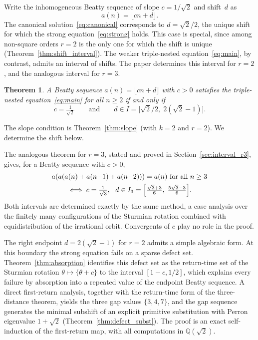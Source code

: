 \documentclass{birkjour}
\newtheorem{theorem}{Theorem}
\theoremstyle{definition}
\theoremstyle{remark}
\newcommand{\fl}[1]{\lfloor #1 \rfloor}
\newcommand{\frc}[1]{\{ #1 \}}
\begin{document}
Write the inhomogeneous Beatty sequence of slope
$c=1/\!\sqrt{2}$ and shift~$d$ as
\[
  a(n)=\fl{cn+d}.
\]
The canonical
solution~\eqref{eq:canonical}
corresponds to $d=\sqrt{2}/2$, the unique shift for which
the strong equation~\eqref{eq:strong} holds. This case is
special, since among non-square orders $r=2$ is the only one
for which the shift is unique
(Theorem~\ref{thm:shift_interval}).
The weaker triple-nested
equation~\eqref{eq:main}, by contrast, admits an interval of
shifts. The paper determines this interval for $r=2$, and the
analogous interval for $r=3$.

\begin{theorem}\label{thm:interval}
A Beatty sequence $a(n)=\fl{cn+d}$ with $c>0$ satisfies
the triple-nested equation~\eqref{eq:main} for all $n\ge 2$
if and only if
\[
  c=\tfrac{1}{\sqrt{2}}\qquad\text{and}\qquad
  d\in I=\bigl[\sqrt{2}/2,\;2(\sqrt{2}-1)\bigr].
\]
\end{theorem}

The slope condition is Theorem~\ref{thm:slope} (with $k=2$ and
$r=2$). We determine the shift below.

The analogous theorem for $r=3$, stated and
proved in Section~\ref{sec:interval_r3}, gives, for a
Beatty sequence with $c>0$,
\[
  \begin{aligned}
    &a(a(a(n)+a(n{-}1)+a(n{-}2)))=a(n)
    \ \text{for all } n\ge 3\\
    &\qquad\iff
    c=\tfrac{1}{\sqrt{3}},\ \
    d\in I_{3}=\Bigl[\tfrac{\sqrt{3}+3}{6},\;
    \tfrac{5\sqrt{3}-3}{6}\Bigr].
  \end{aligned}
\]
Both intervals are determined exactly by the same method, a
case analysis over the finitely many configurations of the
Sturmian rotation combined with equidistribution of the
irrational orbit. Convergents of $c$ play no role in the
proof.

The right endpoint $d=2(\sqrt{2}{-}1)$ for $r=2$
admits a simple algebraic form. At this boundary
the strong equation fails on a sparse defect
set. Theorem~\ref{thm:absorption} identifies
this defect set as the return-time set of the
Sturmian rotation $\theta\mapsto\frc{\theta+c}$
to the interval $[1{-}c,1/2]$, which explains
every failure by absorption into a repeated value
of the endpoint Beatty sequence. A direct first-return
analysis, together with the return-time form of the
three-distance theorem, yields the three gap values
$\{3,4,7\}$, and the
gap sequence generates the minimal subshift of an
explicit primitive substitution with Perron
eigenvalue $1+\sqrt{2}$
(Theorem~\ref{thm:defect_subst}). The proof is an
exact self-induction of the first-return map, with
all computations in $\mathbb{Q}(\sqrt{2})$.
\end{document}
